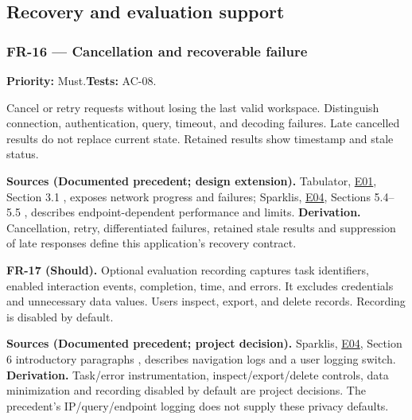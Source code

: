 \documentclass[11pt,a4paper]{article}
\newcommand{\req}[4]{\subsubsection*{#1 --- #2}\phantomsection\label{req:#1}\textbf{Priority:} #3.\quad\textbf{Tests:} #4.\par}
\newcommand{\origin}[3]{\par{\small\textbf{Sources (#1).} #2 \textbf{Derivation.} #3\par}}
\newcommand{\evidence}[1]{\hyperlink{evidence:#1}{#1}}
\begin{document}
\subsection{Recovery and evaluation support}
\par\noindent\begin{minipage}{\linewidth}
\req{FR-16}{Cancellation and recoverable failure}{Must}{AC-08}
Cancel or retry requests without losing the last valid workspace. Distinguish connection, authentication, query, timeout, and decoding failures. Late cancelled results do not replace current state. Retained results show timestamp and stale status.
\origin{Documented precedent; design extension}{Tabulator, \evidence{E01}, Section 3.1 \citep{tabulator}, exposes network progress and failures; Sparklis, \evidence{E04}, Sections 5.4--5.5 \citep{sparklis}, describes endpoint-dependent performance and limits.}{Cancellation, retry, differentiated failures, retained stale results and suppression of late responses define this application's recovery contract.}
\end{minipage}\par
\par\noindent\begin{minipage}{\linewidth}
\textbf{FR-17 (Should).} Optional evaluation recording captures task identifiers, enabled interaction events, completion, time, and errors. It excludes credentials and unnecessary data values. Users inspect, export, and delete records. Recording is disabled by default.
\origin{Documented precedent; project decision}{Sparklis, \evidence{E04}, Section 6 introductory paragraphs \citep{sparklis}, describes navigation logs and a user logging switch.}{Task/error instrumentation, inspect/export/delete controls, data minimization and recording disabled by default are project decisions. The precedent's IP/query/endpoint logging does not supply these privacy defaults.}
\end{minipage}\par
\end{document}
